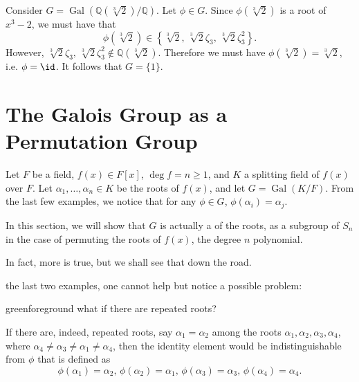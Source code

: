 \documentclass[notoc,notitlepage,nobib]{tufte-book}
\DeclareMathOperator{\Gal}{Gal}
\begin{document}

\begin{eg}\label{eg:galois_elements_can_only_permute_roots_in_the_same_field}
  Consider $G = \Gal(\mathbb{Q}(\sqrt[3]{2}) / \mathbb{Q})$. Let $\phi \in G$.
  Since $\phi(\sqrt[3]{2})$ is a root of $x^3 - 2$, we must have that
  \begin{equation*}
    \phi(\sqrt[3]{2}) \in \left\{ \sqrt[3]{2}, \, \sqrt[3]{2} \zeta_3, \,
    \sqrt[3]{2} \zeta_3^2 \right\}.
  \end{equation*}
  However, $\sqrt[3]{2} \zeta_3, \, \sqrt[3]{2} \zeta_3^2 \notin
  \mathbb{Q}(\sqrt[3]{2})$. Therefore we must have $\phi(\sqrt[3]{2}) =
  \sqrt[3]{2}$, i.e. $\phi = \id$. It follows that $G = \{ 1 \}$.
\end{eg} 


\section{The Galois Group as a Permutation Group}%
\label{sec:the_galois_group_as_a_permutation_group}

Let $F$ be a field, $f(x) \in F[x]$, $\deg f = n \geq 1$, and $K$ a splitting
field of $f(x)$ over $F$. Let $\alpha_1, \ldots, \alpha_n \in K$ be the roots of
$f(x)$, and let $G = \Gal(K / F)$. From the last few examples, we notice that
for any $\phi \in G$, $\phi(\alpha_i) = \alpha_j$.

In this section, we will show that $G$ is actually a 
of the roots, as a subgroup of $S_n$ in the case of permuting the roots of
$f(x)$, the degree $n$ polynomial.

In fact, more is true, but we shall see that down the road.

 the last two examples, one cannot help but notice a possible
problem:
\begin{quotebox}{green}{foreground}
  what if there are repeated roots?
\end{quotebox}
If there are, indeed, repeated roots, say $\alpha_1 = \alpha_2$ among the roots
$\alpha_1, \alpha_2, \alpha_3, \alpha_4$, where $\alpha_4 \neq \alpha_3 \neq
\alpha_1 \neq \alpha_4$, then the identity element would be indistinguishable
from $\phi$ that is defined as
\begin{equation*}
  \phi(\alpha_1) = \alpha_2, \, \phi(\alpha_2) = \alpha_1, \, \phi(\alpha_3) =
  \alpha_3, \, \phi(\alpha_4) = \alpha_4.
\end{equation*}
\end{document}
